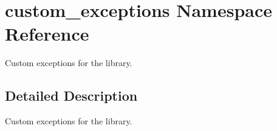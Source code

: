 \hypertarget{namespacecustom__exceptions}{
\section{custom\-\_\-exceptions \-Namespace \-Reference}
\label{namespacecustom__exceptions}
}


\-Custom exceptions for the library.  




\subsection{\-Detailed \-Description}
\-Custom exceptions for the library. 